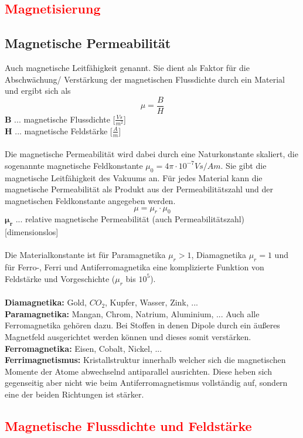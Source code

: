 		\subsection{\textcolor{red}{Magnetisierung}}
		\subsection{Magnetische Permeabilität}
			Auch magnetische Leitfähigkeit genannt. Sie dient als Faktor für die Abschwächung/ Verstärkung der magnetischen Flussdichte durch ein Material und ergibt sich als
			\[ \mu = \dfrac{B}{H} \]
			\leavevmode
			\tab[1cm] \textbf{B} \tab ... \tab magnetische Flussdichte [$ \frac{Vs}{m^{2}} $]\\
			\tab[1cm] \textbf{H} \tab ... \tab magnetische Feldstärke [$ \frac{A}{m} $]\\\\
			Die magnetische Permeabilität wird dabei durch eine Naturkonstante skaliert, die sogenannte magnetische Feldkonstante $ \mu_{0} = 4\pi\cdot 10^{-7} Vs/Am $. Sie gibt die magnetische Leitfähigkeit des Vakuums an. Für jedes Material kann die magnetische Permeabilität als Produkt aus der Permeabilitätszahl und der magnetischen Feldkonstante angegeben werden.
			\[ \mu = \mu_{r}\cdot\mu_{0}\]
			\tab[1cm] \textbf{$ \bm{\mu_{r}} $} \tab ... \tab relative magnetische Permeabilität (auch Permeabilitätszahl) [dimensionslos]\\\\
			Die Materialkonstante ist für Paramagnetika $ \mu_{r} > 1 $, Diamagnetika $ \mu_{r} = 1$ und für Ferro-, Ferri und Antiferromagnetika eine komplizierte Funktion von Feldstärke und Vorgeschichte ($ \mu_{r} $ bis $ 10^{5} $).\\\\
			\textbf{Diamagnetika:} Gold, $ CO_{2} $, Kupfer, Wasser, Zink, ... \\
			\textbf{Paramagnetika:} Mangan, Chrom, Natrium, Aluminium, ... Auch alle Ferromagnetika gehören dazu. Bei Stoffen in denen Dipole durch ein äußeres Magnetfeld ausgerichtet werden können und dieses somit verstärken.\\
			\textbf{Ferromagnetika:} Eisen, Cobalt, Nickel, ... \\
			\textbf{Ferrimagnetismus:} Kristallstruktur innerhalb welcher sich die magnetischen Momente der Atome abwechselnd antiparallel ausrichten. Diese heben sich gegenseitig aber nicht wie beim Antiferromagnetismus vollständig auf, sondern eine der beiden Richtungen ist stärker.
		\subsection{\textcolor{red}{Magnetische Flussdichte und Feldstärke}}
				
